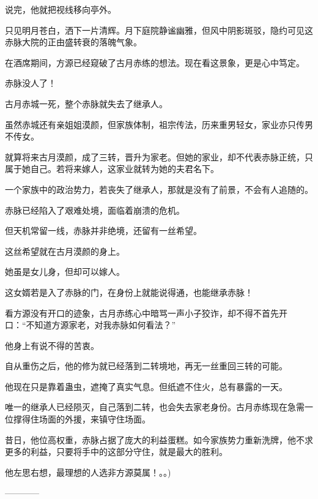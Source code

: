 \begin{this_body}
说完，他就把视线移向亭外。

只见明月苍白，洒下一片清辉。月下庭院静谧幽雅，但风中阴影斑驳，隐约可见这赤脉大院的正由盛转衰的落魄气象。

在酒席期间，方源已经窥破了古月赤练的想法。现在看这景象，更是心中笃定。

赤脉没人了！

古月赤城一死，整个赤脉就失去了继承人。

虽然赤城还有亲姐姐漠颜，但家族体制，祖宗传法，历来重男轻女，家业亦只传男不传女。

就算将来古月漠颜，成了三转，晋升为家老。但她的家业，却不代表赤脉正统，只属于她自己。若将来嫁人，这家业就转为她的夫君名下。

一个家族中的政治势力，若丧失了继承人，那就是没有了前景，不会有人追随的。

赤脉已经陷入了艰难处境，面临着崩溃的危机。

但天机常留一线，赤脉并非绝境，还留有一丝希望。

这丝希望就在古月漠颜的身上。

她虽是女儿身，但却可以嫁人。

这女婿若是入了赤脉的门，在身份上就能说得通，也能继承赤脉！

看方源没有开口的迹象，古月赤练心中暗骂一声小子狡诈，却不得不首先开口：“不知道方源家老，对我赤脉如何看法？”

他身上有说不得的苦衷。

自从重伤之后，他的修为就已经落到二转境地，再无一丝重回三转的可能。

他现在只是靠着蛊虫，遮掩了真实气息。但纸遮不住火，总有暴露的一天。

唯一的继承人已经陨灭，自己落到二转，也会失去家老身份。古月赤练现在急需一位撑得住场面的外援，来镇守住场面。

昔日，他位高权重，赤脉占据了庞大的利益蛋糕。如今家族势力重新洗牌，他不求更多的利益，只要将手中的这部分守住，就是最大的胜利。

他左思右想，最理想的人选非方源莫属！。。)

------------

\end{this_body}


